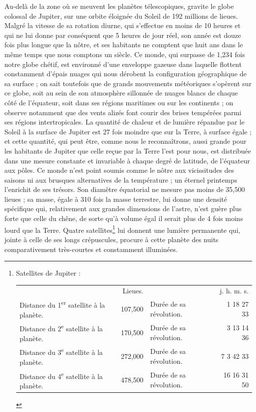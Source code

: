 \documentclass[a4paper, 11pt, oneside, landscape]{article}
\begin{document}
Au-delà de la zone où se meuvent les planètes télescopiques, gravite le globe colossal de Jupiter, sur une orbite éloignée du Soleil de 192 millions de lieues. Malgré la vitesse de sa rotation diurne, qui s'effectue en moins de 10 heures et qui ne lui donne par conséquent que 5 heures de jour réel, son année est douze fois plus longue que la nôtre, et ses habitants ne comptent que huit ans dans le même temps que nous comptons un siècle. Ce monde, qui surpasse de 1,234 fois notre globe chétif, est environné d'une enveloppe gazeuse dans laquelle flottent constamment d'épais nuages qui nous dérobent la configuration géographique de sa surface ; on sait toutefois que de grands mouvements météoriques s'opèrent sur ce globe, soit au sein de son atmosphère sillonnée de nuages blancs de chaque côté de l'équateur, soit dans ses régions maritimes ou sur les continents ; on observe notamment que des vents alizés font courir des brises tempérées parmi ses régions intertropicales. La quantité de chaleur et de lumière répandue par le Soleil à la surface de Jupiter est 27 fois moindre que sur la Terre, à surface égale ; et cette quantité, qui peut être, comme nous le reconnaîtrons, aussi grande pour les habitants de Jupiter que celle reçue par la Terre l'est pour nous, est distribuée dans une mesure constante et invariable à chaque degré de latitude, de l'équateur aux pôles. Ce monde n'est point soumis comme le nôtre aux vicissitudes des saisons ni aux brusques alternatives de la température ; un éternel printemps l'enrichit de ses trésors. Son diamètre équatorial ne mesure pas moins de 35,500 lieues ; sa masse, égale à 310 fois la masse terrestre, lui donne une densité spécifique qui, relativement aux grandes dimensions de l'astre, n'est guère plus forte que celle du chêne, de sorte qu'à volume égal il serait plus de 4 fois moins lourd que la Terre. Quatre satellites\footnote{Satellites de Jupiter :\\
\begin{table}[H]
    \centering\color{BrickRed}
    \bfseries
    \footnotesize
    \begin{tabular}{l r l r}
        ~ & Lieues. & ~ & j. h. m. s.   \\
        Distance du 1\textsuperscript{er} satellite à la planète. & 107,500 & Durée de sa révolution. & 1 18 27 33   \\
        Distance du 2\textsuperscript{e} satellite à la planète. & 170,500 & Durée de sa révolution. & 3 13 14 36   \\
        Distance du 3\textsuperscript{e} satellite à la planète. & 272,000 & Durée de sa révolution. & 7 3 42 33   \\
        Distance du 4\textsuperscript{e} satellite à la planète. & 478,500 & Durée de sa révolution. & 16 16 31 50 \\
    \end{tabular}
\end{table}} lui donnent une lumière permanente qui, jointe à celle de ses longs crépuscules, procure à cette planète des nuits comparativement très-courtes et constamment illuminées.
\end{document}
